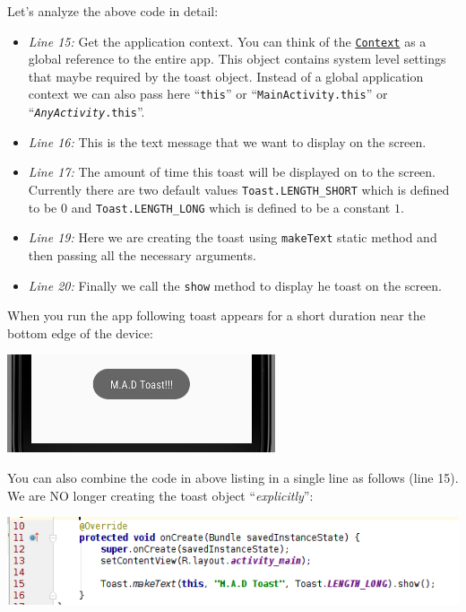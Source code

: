 Let's analyze the above code in detail:
\begin{itemize}
	\item \textit{Line 15:} Get the application context. You can think of the \href{https://developer.android.com/reference/android/content/Context.html}{\texttt{Context}} as a global reference to the entire app. This object contains system level settings that maybe required by the toast object. Instead of a global application context we can also pass here ``\texttt{this}'' or ``\texttt{MainActivity.this}'' or ``\texttt{\textit{AnyActivity}.this}''.
	
	\item \textit{Line 16:} This is the text message that we want to display on the screen.
	
	\item \textit{Line 17:} The amount of time this toast will be displayed on to the screen. Currently there are two default values \texttt{Toast.LENGTH\_SHORT} which is defined to be $0$ and \texttt{Toast.LENGTH\_LONG} which is defined to be a constant $1$.
	
	\item \textit{Line 19:} Here we are creating the toast using \texttt{makeText} static method and then passing all the necessary arguments.
	
	\item \textit{Line 20:} Finally we call the \texttt{show} method to display he toast on the screen.
\end{itemize}

When you run the app following toast appears for a short duration near the bottom edge of the device:

\begin{center}
	\includegraphics[scale=0.4]{chapters/ch06/images/14}
\end{center}

You can also combine the code in above listing in a single line as follows (line 15). We are NO longer creating the toast object ``\textit{explicitly}'':

\begin{center}
	\includegraphics[scale=0.4]{chapters/ch06/images/15}
\end{center}


